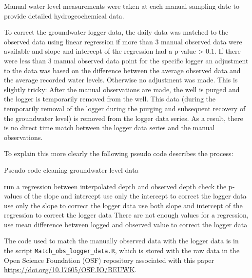 \documentclass[, manuscript]{copernicus}
\begin{document}
Manual water level measurements were taken at each manual sampling date
to provide detailed hydrogeochemical data.

To correct the groundwater logger data, the daily data was matched to
the observed data using linear regression if more than 3 manual observed
data were available and slope and intercept of the regression had a
p-value \textgreater{} 0.1. If there were less than 3 manual observed
data point for the specific logger an adjustment to the data was based
on the difference between the average observed data and the average
recorded water levels. Otherwise no adjustment was made. This is
slightly tricky: After the manual observations are made, the well is
purged and the logger is temporarily removed from the well. This data
(during the temporarily removal of the logger during the purging and
subsequent recovery of the groundwater level) is removed from the logger
data series. As a result, there is no direct time match between the
logger data series and the manual observations.

To explain this more clearly the following pseudo code describes the
process:

\begin{algorithm}
\caption{Pseudo code cleaning groundwater level data}
\label{a1}
\begin{algorithmic}
        \STATE run a regression between interpolated depth and observed depth  
        \STATE check the p-values of the slope and intercept
                \STATE  use only the intercept to correct the logger data
        \ELSE
                        \STATE use only the slope to correct the logger data
                \ELSE
                       \STATE use both slope and intercept of the regression to correct the logger data
                \ENDIF
        \ENDIF
\ELSE
        \STATE There are not enough values for a regression, use mean difference between logged and observed value to correct the logger data
\ENDIF
\end{algorithmic}
\end{algorithm}

The code used to match the manually observed data with the logger data
is in the script \texttt{Match\_obs\_logger\_data.R}, which is stored
with the raw data in the Open Science Foundation (OSF) repository
associated with this paper \url{https://doi.org/10.17605/OSF.IO/BEUWK}.
\end{document}
